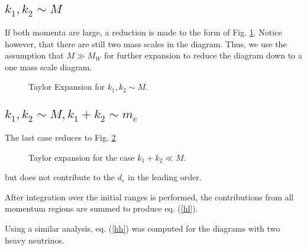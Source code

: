 \subsection{$ k_{1}, k_{2} \sim M $}

If both momenta are large, a reduction is made to the form of Fig.
\ref{fig:large_k}.  Notice however, that there are still two mass
scales in the diagram.  Thus, we use the assumption that $M \gg
M_{W}$ for further expansion to reduce the diagram down to a one
mass scale diagram.
%
%
\begin{figure}[htb]
\begin{center}
\epsfxsize=45mm  \caption{Taylor Expansion for
$k_{1}, k_{2} \sim M$.} \label{fig:large_k}
\end{center}
\end{figure}
%
%

\subsection{$ k_{1},k_{2}  \sim M, k_{1}+k_{2} \sim m_{e}$}

The last case reduces to Fig. \ref{fig:sum}
%
%
\begin{figure}[htb]
\begin{center}
\epsfxsize=45mm  \caption{Taylor expansion
for the case $k_{1}+k_{2} \ll M$.} \label{fig:sum}
\end{center}
\end{figure}
%
%
but does not contribute to the $d_{e}$ in the leading order.

After integration over the initial ranges is performed, the
contributions from all momentum regions are summed to produce eq.
(\ref{hl}).

Using a similar analysis, eq. (\ref{hh}) was computed for the
diagrams with two heavy neutrinos.



%
%
%

